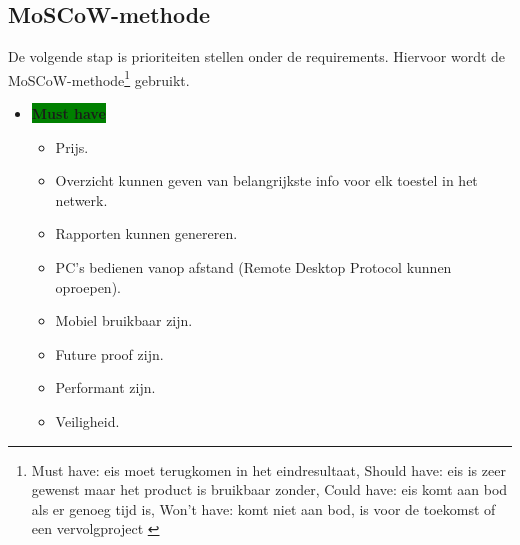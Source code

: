 \subsection{MoSCoW-methode}

De volgende stap is prioriteiten stellen onder de requirements. Hiervoor wordt de MoSCoW-methode\footnote{Must have: eis moet terugkomen in het eindresultaat, Should have: eis is zeer gewenst maar het product is bruikbaar zonder, Could have: eis komt aan bod als er genoeg tijd is, Won't have: komt niet aan bod, is voor de toekomst of een vervolgproject \autocite{Wikipedia2020}} gebruikt.

\begin{itemize}
    \item \textbf{\colorbox{green}{Must have}}
    \begin{itemize}
        \item Prijs.
        \item Overzicht kunnen geven van belangrijkste info voor elk toestel in het netwerk.
        \item Rapporten kunnen genereren.
        \item PC's bedienen vanop afstand (Remote Desktop Protocol kunnen oproepen).
        \item Mobiel bruikbaar zijn.
        \item Future proof zijn.
        \item Performant zijn.
        \item Veiligheid.
        

\end{itemize}
\end{itemize}
